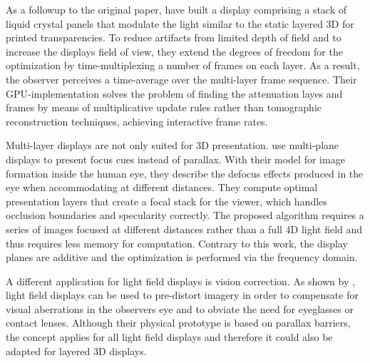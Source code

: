 As a followup to the original paper, \cite{WetzsteinTensor} have built a display comprising a stack of liquid crystal panels that modulate the light similar to the static layered 3D for printed transparencies.
To reduce artifacts from limited depth of field and to increase the displays field of view, they extend the degrees of freedom for the optimization by time-multiplexing a number of frames on each layer.
As a result, the observer perceives a time-average over the multi-layer frame sequence.
Their GPU-implementation solves the problem of finding the attenuation layes and frames by means of multiplicative update rules rather than tomographic reconstruction techniques, achieving interactive frame rates.

Multi-layer displays are not only suited for 3D presentation.
\cite{FocusCuesMultiPlaneDisplays} use multi-plane displays to present focus cues instead of parallax.
With their model for image formation inside the human eye, they describe the defocus effects produced in the eye when accommodating at different distances.
They compute optimal presentation layers that create a focal stack for the viewer, which handles occlusion boundaries and specularity correctly.
The proposed algorithm requires a series of images focused at different distances rather than a full 4D light field and thus requires less memory for computation.
Contrary to this work, the display planes are additive and the optimization is performed via the frequency domain.

A different application for light field displays is vision correction.
As shown by \cite{EyeglassesFreeDisplay}, light field displays can be used to pre-distort imagery in order to compensate for visual aberrations in the observers eye and to obviate the need for eyeglasses or contact lenses.
Although their physical prototype is based on parallax barriers, the concept applies for all light field displays and therefore it could also be adapted for layered 3D displays.
